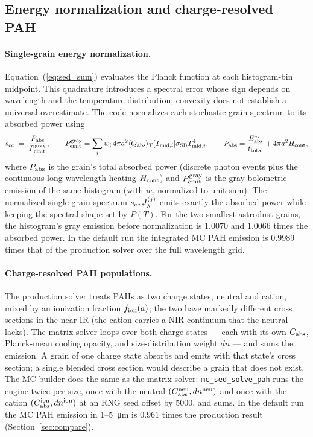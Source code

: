 \documentclass{my_memo}
\newcommand{\Cabs}{C_{\rm abs}}
\newcommand{\QplT}{\langle Q_{\rm abs} \rangle_T}
\newcommand{\sigmaSB}{\sigma_{\rm SB}}
\begin{document}
\subsection{Energy normalization and charge-resolved PAH}
\label{sec:charge_rescale}

\paragraph{Single-grain energy normalization.}
Equation~(\ref{eq:sed_sum}) evaluates the Planck function at each
histogram-bin midpoint. This quadrature introduces a spectral error
whose sign depends on wavelength and the temperature distribution;
convexity does not establish a universal overestimate. The code
normalizes each stochastic grain spectrum to its absorbed power using
\begin{equation}\label{eq:ec_rescale}
s_{\rm ec} \;=\; \frac{P_{\rm abs}}{P_{\rm emit}^{\rm gray}}, \qquad
P_{\rm emit}^{\rm gray} = \sum_i w_i\, 4\pi a^2 \QplT[T_{{\rm mid},i}]
   \sigmaSB T_{{\rm mid},i}^4, \qquad
P_{\rm abs} = \frac{E_{\rm abs}^{\rm evt}}{t_{\rm total}}
   + 4\pi a^2 H_{\rm cont},
\end{equation}
where $P_{\rm abs}$ is the grain's total absorbed power (discrete
photon events plus the continuous long-wavelength heating
$H_{\rm cont}$) and $P_{\rm emit}^{\rm gray}$ is the gray bolometric
emission of the same histogram (with $w_i$ normalized to unit sum).
The normalized single-grain spectrum $s_{\rm ec}\,J_\lambda^{(j)}$
emits exactly the absorbed power while keeping the spectral shape set
by $P(T)$. For the two smallest astrodust grains, the histogram's gray
emission before normalization is $1.0070$ and $1.0066$ times the
absorbed power. In the default run the integrated MC PAH emission is
$0.9989$ times that of the production solver over the full wavelength
grid.

\paragraph{Charge-resolved PAH populations.}
The production solver treats PAHs as two charge states, neutral and
cation, mixed by an ionization fraction $f_{\rm ion}(a)$;
the two have markedly different cross sections in the near-IR (the
cation carries a \citet{Mattioda2005} NIR continuum that the neutral
lacks).  The matrix solver loops over both charge states --- each with
its own $\Cabs$, Planck-mean cooling opacity, and size-distribution
weight $dn$ --- and sums the emission. A grain of one charge state
absorbs and emits with that state's cross section; a single blended
cross section would describe a grain that does not exist. The MC
builder does the same as the matrix solver:
\verb|mc_sed_solve_pah| runs the engine twice per size, once with the
neutral $(\Cabs^{\rm neu}, dn^{\rm neu})$ and once with the cation
$(\Cabs^{\rm ion}, dn^{\rm ion})$ at an RNG seed offset by 5000, and
sums. In the default run the MC PAH emission in 1--\SI{5}{\micro\meter}
is $0.961$ times the production result
(Section~\ref{sec:compare}).
\end{document}

